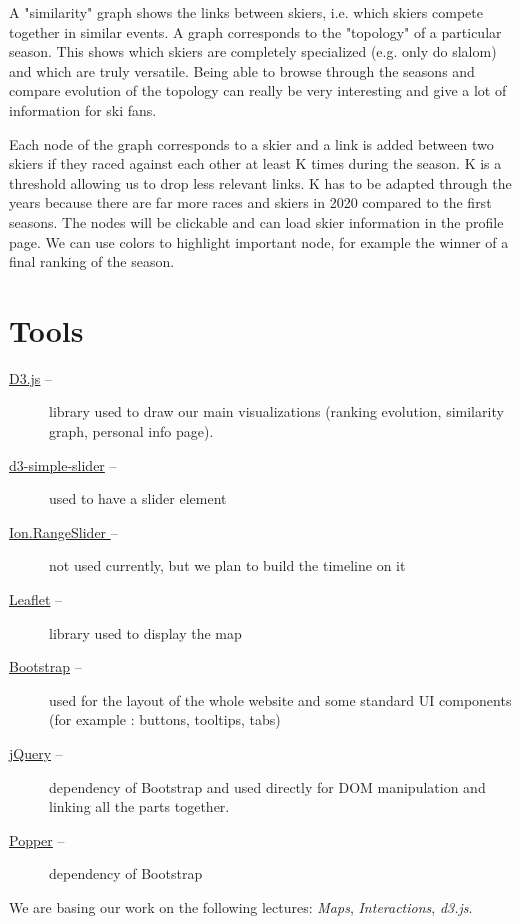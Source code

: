 \documentclass[a4paper,10pt]{article}
\begin{document}
A "similarity" graph shows the links between skiers, i.e. which skiers compete together in similar events.
A graph corresponds to the "topology" of a particular season.
This shows which skiers are completely specialized (e.g. only do slalom) and which are truly versatile.
Being able to browse through the seasons and compare evolution of the topology can really be very interesting and give a lot of information for ski fans.

Each node of the graph corresponds to a skier and a link is added between two skiers if they raced against each other at least K times during the season.
K is a threshold allowing us to drop less relevant links.
K has to be adapted through the years because there are far more races and skiers in 2020 compared to the first seasons.
The nodes will be clickable and can load skier information in the profile page.
We can use colors to highlight important node, for example the winner of a final ranking of the season.

\section{Tools}

\begin{description}
    \item[\href{https://d3js.org/}{D3.js} --] library used to draw our main visualizations (ranking evolution, similarity graph, personal info page).
    \item[\href{https://github.com/johnwalley/d3-simple-slider}{d3-simple-slider} --] used to have a slider element
    \item[\href{https://github.com/IonDen/ion.rangeSlider}{Ion.RangeSlider } --] not used currently, but we plan to build the timeline on it
    \item[\href{https://leafletjs.com/}{Leaflet} --] library used to display the map
    \item[\href{https://getbootstrap.com/}{Bootstrap} --] used for the layout of the whole website and some standard UI components (for example : buttons, tooltips, tabs)
    \item[\href{https://jquery.com/}{jQuery} --] dependency of Bootstrap and used directly for DOM manipulation and linking all the parts together.
    \item[\href{https://popper.js.org/}{Popper} --] dependency of Bootstrap
\end{description}

We are basing our work on the following lectures: \textit{Maps}, \textit{Interactions}, \textit{d3.js}.
\end{document}
